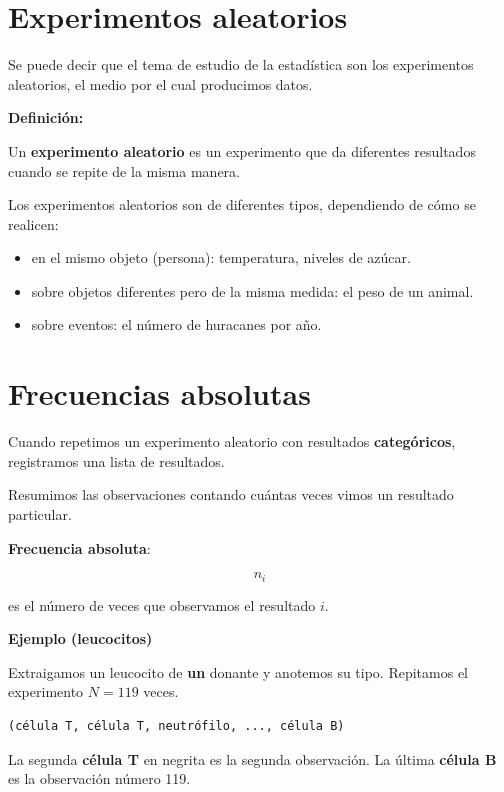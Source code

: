 \documentclass[
]{book}
\providecommand{\tightlist}{%
  \setlength{\itemsep}{0pt}\setlength{\parskip}{0pt}}
\begin{document}
\hypertarget{experimentos-aleatorios}{%
\section{Experimentos aleatorios}\label{experimentos-aleatorios}}

Se puede decir que el tema de estudio de la estadística son los experimentos aleatorios, el medio por el cual producimos datos.

\textbf{Definición:}

Un \textbf{experimento aleatorio} es un experimento que da diferentes resultados cuando se repite de la misma manera.

Los experimentos aleatorios son de diferentes tipos, dependiendo de cómo se realicen:

\begin{itemize}
\tightlist
\item
  en el mismo objeto (persona): temperatura, niveles de azúcar.
\item
  sobre objetos diferentes pero de la misma medida: el peso de un animal.
\item
  sobre eventos: el número de huracanes por año.
\end{itemize}

\hypertarget{frecuencias-absolutas}{%
\section{Frecuencias absolutas}\label{frecuencias-absolutas}}

Cuando repetimos un experimento aleatorio con resultados \textbf{categóricos}, registramos una lista de resultados.

Resumimos las observaciones contando cuántas veces vimos un resultado particular.

\textbf{Frecuencia absoluta}:

\[n_i\]

es el número de veces que observamos el resultado \(i\).

\textbf{Ejemplo (leucocitos)}

Extraigamos un leucocito de \textbf{un} donante y anotemos su tipo. Repitamos el experimento \(N=119\) veces.

\begin{verbatim}
(célula T, célula T, neutrófilo, ..., célula B)
\end{verbatim}

La segunda \textbf{célula T} en negrita es la segunda observación. La última \textbf{célula B} es la observación número 119.
\end{document}
